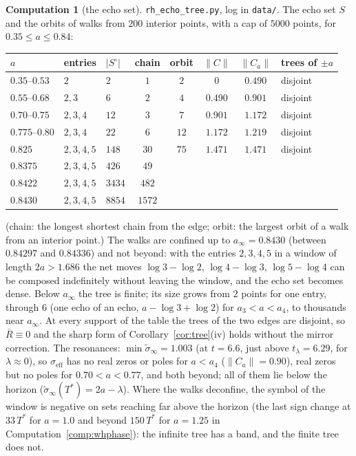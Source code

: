 \documentclass[11pt]{article}
\theoremstyle{definition}
\newtheorem{computation}[theorem]{Computation}
\theoremstyle{remark}
\newcommand{\Tst}{T^{*}}
\begin{document}
\begin{computation}[the echo set]\label{comp:tree}
\texttt{rh\_echo\_tree.py}, log in \texttt{data/}. The echo set $S$ and the orbits of walks from $200$ interior points, with a cap of $5000$ points, for $0.35\le a\le0.84$:
\begin{center}\small
\begin{tabular}{@{}lllccccl@{}}
\toprule
$a$ & entries & $|S^\circ|$ & chain & orbit & $\|C\|$ & $\|C_a\|$ & trees of $\pm a$\\
\midrule
$0.35$--$0.53$ & $2$ & $2$ & $1$ & $2$ & $0$ & $0.490$ & disjoint\\
$0.55$--$0.68$ & $2,3$ & $6$ & $2$ & $4$ & $0.490$ & $0.901$ & disjoint\\
$0.70$--$0.75$ & $2,3,4$ & $12$ & $3$ & $7$ & $0.901$ & $1.172$ & disjoint\\
$0.775$--$0.80$ & $2,3,4$ & $22$ & $6$ & $12$ & $1.172$ & $1.219$ & disjoint\\
$0.825$ & $2,3,4,5$ & $148$ & $30$ & $75$ & $1.471$ & $1.471$ & disjoint\\
$0.8375$ & $2,3,4,5$ & $426$ & $49$ & & & & \\
$0.8422$ & $2,3,4,5$ & $3434$ & $482$ & & & & \\
$0.8430$ & $2,3,4,5$ & $8854$ & $1572$ & & & & \\
\bottomrule
\end{tabular}
\end{center}
\noindent (chain: the longest shortest chain from the edge; orbit: the largest orbit of a walk from an interior point.) The walks are confined up to $a_\infty=0.8430$ (between $0.84297$ and $0.84336$) and not beyond: with the entries $2,3,4,5$ in a window of length $2a>1.686$ the net moves $\log3-\log2$, $\log4-\log3$, $\log5-\log4$ can be composed indefinitely without leaving the window, and the echo set becomes dense. Below $a_\infty$ the tree is finite; its size grows from $2$ points for one entry, through $6$ (one echo of an echo, $a-\log3+\log2$) for $a_3<a<a_4$, to thousands near $a_\infty$. At every support of the table the trees of the two edges are disjoint, so $\bar R\equiv0$ and the sharp form of Corollary~\ref{cor:tree}(iv) holds without the mirror correction. The resonances: $\min\tilde\sigma_\infty=1.003$ (at $t=6.6$, just above $t_\lambda=6.29$, for $\lambda\approx0$), so $\sigma_{\mathrm{eff}}$ has no real zeros or poles for $a<a_4$ ($\|C_a\|=0.90$), real zeros but no poles for $0.70<a<0.77$, and both beyond; all of them lie below the horizon ($\tilde\sigma_\infty(\Tst)=2a-\lambda$). Where the walks deconfine, the symbol of the window is negative on sets reaching far above the horizon (the last sign change at $33\,\Tst$ for $a=1.0$ and beyond $150\,\Tst$ for $a=1.25$ in Computation~\ref{comp:whphase}): the infinite tree has a band, and the finite tree does not.
\end{computation}
\end{document}
